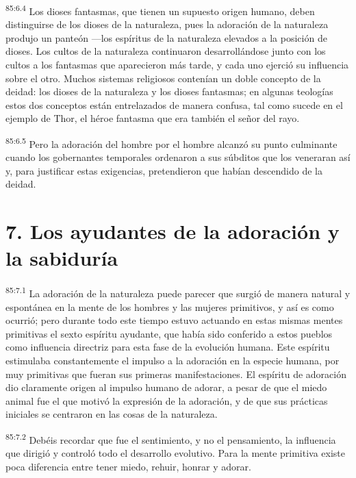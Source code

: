 \par
\textsuperscript{85:6.4} Los dioses fantasmas, que tienen un supuesto origen humano, deben distinguirse de los dioses de la naturaleza, pues la adoración de la naturaleza produjo un panteón ---los espíritus de la naturaleza elevados a la posición de dioses. Los cultos de la naturaleza continuaron desarrollándose junto con los cultos a los fantasmas que aparecieron más tarde, y cada uno ejerció su influencia sobre el otro. Muchos sistemas religiosos contenían un doble concepto de la deidad: los dioses de la naturaleza y los dioses fantasmas; en algunas teologías estos dos conceptos están entrelazados de manera confusa, tal como sucede en el ejemplo de Thor, el héroe fantasma que era también el señor del rayo.

\par
\textsuperscript{85:6.5} Pero la adoración del hombre por el hombre alcanzó su punto culminante cuando los gobernantes temporales ordenaron a sus súbditos que los veneraran así y, para justificar estas exigencias, pretendieron que habían descendido de la deidad.

\section*{7. Los ayudantes de la adoración y la sabiduría}
\par
\textsuperscript{85:7.1} La adoración de la naturaleza puede parecer que surgió de manera natural y espontánea en la mente de los hombres y las mujeres primitivos, y así es como ocurrió; pero durante todo este tiempo estuvo actuando en estas mismas mentes primitivas el sexto espíritu ayudante, que había sido conferido a estos pueblos como influencia directriz para esta fase de la evolución humana. Este espíritu estimulaba constantemente el impulso a la adoración en la especie humana, por muy primitivas que fueran sus primeras manifestaciones. El espíritu de adoración dio claramente origen al impulso humano de adorar, a pesar de que el miedo animal fue el que motivó la expresión de la adoración, y de que sus prácticas iniciales se centraron en las cosas de la naturaleza.

\par
\textsuperscript{85:7.2} Debéis recordar que fue el sentimiento, y no el pensamiento, la influencia que dirigió y controló todo el desarrollo evolutivo. Para la mente primitiva existe poca diferencia entre tener miedo, rehuir, honrar y adorar.

